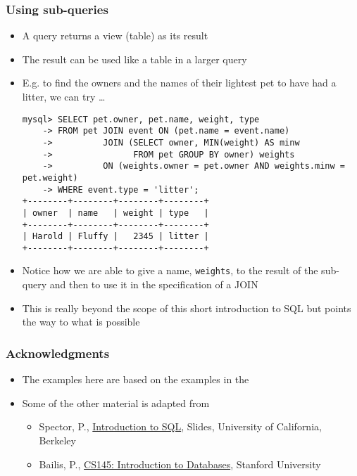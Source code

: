 \documentclass[hyperref={pdfpagelabels=false},svgnames,xcolor=table]{beamer}
\begin{document}
\begin{frame}[shrink=10,fragile]
  \frametitle{Using sub-queries}
  \begin{itemize}
    \item A query returns a view (table) as its result
    \item The result can be used like a table in a larger query
    \item E.g. to find the owners and the names of their lightest pet
      to have had a litter, we can try \ldots
      \begin{scriptsize}
\begin{verbatim}
mysql> SELECT pet.owner, pet.name, weight, type 
    -> FROM pet JOIN event ON (pet.name = event.name) 
    ->          JOIN (SELECT owner, MIN(weight) AS minw 
    ->                FROM pet GROUP BY owner) weights 
    ->          ON (weights.owner = pet.owner AND weights.minw = pet.weight) 
    -> WHERE event.type = 'litter';
+--------+--------+--------+--------+
| owner  | name   | weight | type   |
+--------+--------+--------+--------+
| Harold | Fluffy |   2345 | litter |
+--------+--------+--------+--------+
\end{verbatim}
      \end{scriptsize}
    \item Notice how we are able to give a name, \verb'weights', to the
      result of the sub-query and then to use it in the specification of a
      JOIN
    \item This is really beyond the scope of this short introduction to
      SQL but points the way to what is possible
  \end{itemize}
\end{frame}

\begin{frame}
  \frametitle{Acknowledgments}
  \begin{itemize}
    \item The examples here are based on the examples in 
      the \href{https://dev.mysql.com/doc/refman/5.7/en/tutorial.html}{\color{blue}{MySQL tutorial}}
    \item Some of the other material is adapted from
      \begin{itemize}
        \item Spector, P., \href{https://www.stat.berkeley.edu/~spector/sql.pdf}{\color{blue}Introduction to SQL}, Slides, University of
          California, Berkeley
        \item Bailis, P., \href{http://web.stanford.edu/class/cs145/}{\color{blue}CS145: Introduction to Databases}, Stanford University
      \end{itemize}
  \end{itemize}
\end{frame}
\end{document}
